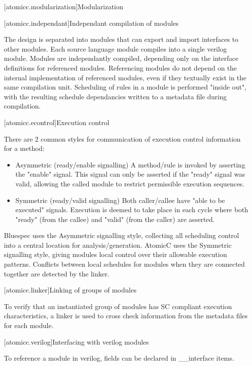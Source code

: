 [atomicc.modularization]{Modularization}

[atomicc.independant]{Independant compilation of modules}

The design is separated into modules that can export and import interfaces to other modules.
Each source language module compiles into a single verilog module.  Modules are independantly
compiled, depending only on the interface definitions for referenced modules.
Referencing modules do not depend on the internal implementation of referenced modules,
even if they textually exist in the same compilation unit.
Scheduling of rules in a module is performed "inside out", with the resulting schedule dependancies written to a metadata file during compilation.

[atomicc.econtrol]{Execution control}

There are 2 common styles for communication of execution control information for a method:
\begin{itemize}
\item Asymmetric (ready/enable signalling)
A method/rule is invoked by asserting the "enable" signal.  This signal can only be
asserted if the "ready" signal was valid, allowing the called module to restrict
permissible execution sequences.

\item Symmetric (ready/valid signalling)
Both caller/callee have "able to be executed" signals.  Execution is deemed to take
place in each cycle where both "ready" (from the callee) and "valid" (from the caller)
are asserted.
\end{itemize}

Bluespec uses the Asymmetric signalling style, collecting all scheduling control into a central location for analysis/generation.
AtomicC uses the Symmetric signalling style, giving modules local control over their allowable execution patterns.  Conflicts between local schedules for modules when they are connected together are detected by the linker.

[atomicc.linker]{Linking of groups of modules}

To verify that an instantiated group of modules has SC compliant execution characteristics, a linker is used to cross check information from the metadata files for each module.

[atomicc.verilog]{Interfacing with verilog modules}

To reference a module in verilog, fields can be declared in __interface items.

